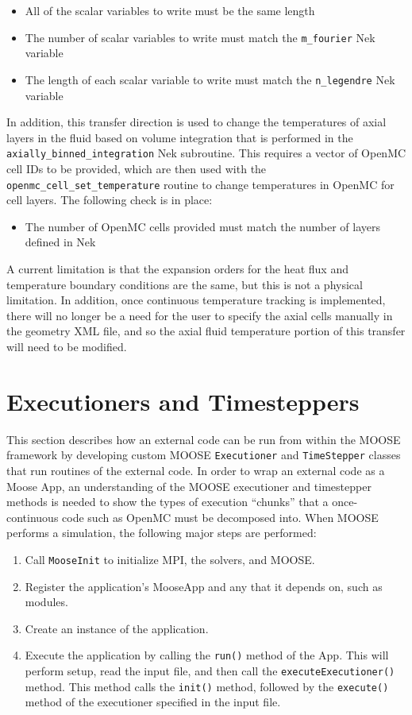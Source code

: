 \documentclass[10pt]{article}
\numberwithin{equation}{section} %
\begin{document}
\begin{itemize}
\item All of the scalar variables to write must be the same length
\item The number of scalar variables to write must match the {\tt m\_fourier} Nek variable
\item The length of each scalar variable to write must match the {\tt n\_legendre} Nek variable
\end{itemize} 

In addition, this transfer direction is used to change the temperatures of axial layers in the fluid based on volume integration that is performed in the {\tt axially\_binned\_integration} Nek subroutine. This requires a vector of OpenMC cell IDs to be provided, which are then used with the {\tt openmc\_cell\_set\_temperature} routine to change temperatures in OpenMC for cell layers. The following check is in place:

\begin{itemize}
\item The number of OpenMC cells provided must match the number of layers defined in Nek
\end{itemize}

\color{magenta}
A current limitation is that the expansion orders for the heat flux and temperature boundary conditions are the same, but this is not a physical limitation. In addition, once continuous temperature tracking is implemented, there will no longer be a need for the user to specify the axial cells manually in the geometry XML file, and so the axial fluid temperature portion of this transfer will need to be modified.
\color{black}
 
\clearpage
\section{Executioners and Timesteppers}
This section describes how an external code can be run from within the MOOSE framework by developing custom MOOSE {\tt Executioner} and {\tt TimeStepper} classes that run routines of the external code. In order to wrap an external code as a Moose App, an understanding of the MOOSE executioner and timestepper methods is needed to show the types of execution ``chunks'' that a once-continuous code such as OpenMC must be decomposed into. When MOOSE performs a simulation, the following major steps are performed:

\begin{enumerate}
\item Call {\tt MooseInit} to initialize MPI, the solvers, and MOOSE.
\item Register the application's MooseApp and any that it depends on, such as modules. 
\item Create an instance of the application.
\item Execute the application by calling the {\tt run()} method of the App. This will perform setup, read the input file, and then call the {\tt executeExecutioner()} method. This method calls the {\tt init()} method, followed by the {\tt execute()} method of the executioner specified in the input file.
\end{enumerate}
\end{document}
